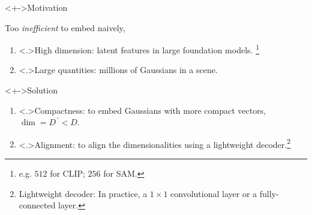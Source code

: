 \begin{frame}
	\begin{block}<+->{Motivation}
		\par Too \emph{inefficient} to embed naively,
		\begin{enumerate}[<+->]
			\item \alert<.>{High dimension:} latent features in large foundation models.
			      \footnote{e.g. \(512\) for CLIP; \(256\) for SAM.}
			\item \alert<.>{Large quantities:} millions of Gaussians in a scene.
		\end{enumerate}
	\end{block}
	\begin{block}<+->{Solution}
		\begin{enumerate}[<+->]
			\item \alert<.>{Compactness:} to embed Gaussians with more compact vectors, \(\dim = D^{\,\prime} < D\).
			\item \alert<.>{Alignment:} to align the dimensionalities using a lightweight decoder.\footnote{Lightweight decoder: In practice, a \(1\times 1\) convolutional layer or a fully-connected layer.}
		\end{enumerate}
	\end{block}
\end{frame}

